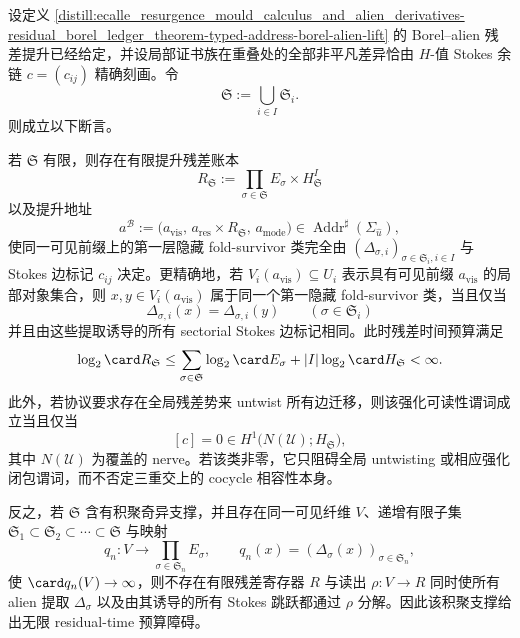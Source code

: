 \begin{theorem}\label{distill:ecalle_resurgence_mould_calculus_and_alien_derivatives-residual_borel_ledger_theorem-finite-budget-and-accumulating-obstruction}
设定义 \ref{distill:ecalle_resurgence_mould_calculus_and_alien_derivatives-residual_borel_ledger_theorem-typed-address-borel-alien-lift} 的 Borel--alien 残差提升已经给定，并设局部证书族在重叠处的全部非平凡差异恰由 \(H\)-值 Stokes 余链 \(c=(c_{ij})\) 精确刻画。令
\[
\mathfrak S:=\bigcup_{i\in I}\mathfrak S_i.
\]
则成立以下断言。

若 \(\mathfrak S\) 有限，则存在有限提升残差账本
\[
R_{\mathfrak S}:=\prod_{\sigma\in\mathfrak S}E_{\sigma}\times H_{\mathfrak S}^{I}
\]
以及提升地址
\[
a^{\mathscr B}:=\bigl(a_{\mathrm{vis}},\,a_{\mathrm{res}}\times R_{\mathfrak S},\,a_{\mathrm{mode}}\bigr)
\in\operatorname{Addr}^{\sharp}(\Sigma_{\hat u}),
\]
使同一可见前缀上的第一层隐藏 fold-survivor 类完全由
\((\Delta_{\sigma,i})_{\sigma\in\mathfrak S_i,i\in I}\) 与 Stokes 边标记 \(c_{ij}\) 决定。更精确地，若
\(V_i(a_{\mathrm{vis}})\subseteq U_i\) 表示具有可见前缀 \(a_{\mathrm{vis}}\) 的局部对象集合，则 \(x,y\in V_i(a_{\mathrm{vis}})\) 属于同一个第一隐藏 fold-survivor 类，当且仅当
\[
\Delta_{\sigma,i}(x)=\Delta_{\sigma,i}(y)\qquad(\sigma\in\mathfrak S_i)
\]
并且由这些提取诱导的所有 sectorial Stokes 边标记相同。此时残差时间预算满足
\[
\log_2\card R_{\mathfrak S}\le
\sum_{\sigma\in\mathfrak S}\log_2\card E_{\sigma}+|I|\log_2\card H_{\mathfrak S}<\infty.
\]
此外，若协议要求存在全局残差势来 untwist 所有边迁移，则该强化可读性谓词成立当且仅当
\[
[c]=0\in H^1\bigl(N(\mathcal U);H_{\mathfrak S}\bigr),
\]
其中 \(N(\mathcal U)\) 为覆盖的 nerve。若该类非零，它只阻碍全局 untwisting 或相应强化闭包谓词，而不否定三重交上的 cocycle 相容性本身。

反之，若 \(\mathfrak S\) 含有积聚奇异支撑，并且存在同一可见纤维 \(V\)、递增有限子集
\(\mathfrak S_1\subset\mathfrak S_2\subset\cdots\subset\mathfrak S\) 与映射
\[
q_n:V\longrightarrow\prod_{\sigma\in\mathfrak S_n}E_{\sigma},\qquad
q_n(x)=(\Delta_{\sigma}(x))_{\sigma\in\mathfrak S_n},
\]
使 \(\card q_n(V)\to\infty\)，则不存在有限残差寄存器 \(R\) 与读出
\(\rho:V\to R\) 同时使所有 alien 提取 \(\Delta_{\sigma}\) 以及由其诱导的所有 Stokes 跳跃都通过 \(\rho\) 分解。因此该积聚支撑给出无限 residual-time 预算障碍。
\end{theorem}
